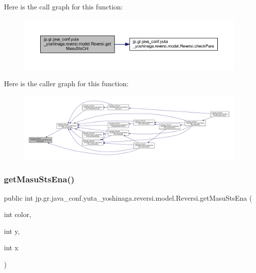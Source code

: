 Here is the call graph for this function\+:\nopagebreak
\begin{figure}[H]
\begin{center}
\leavevmode
\includegraphics[width=350pt]{classjp_1_1gr_1_1java__conf_1_1yuta__yoshinaga_1_1reversi_1_1model_1_1_reversi_a1a528710342faba65975f4768d24b129_cgraph}
\end{center}
\end{figure}
Here is the caller graph for this function\+:\nopagebreak
\begin{figure}[H]
\begin{center}
\leavevmode
\includegraphics[width=350pt]{classjp_1_1gr_1_1java__conf_1_1yuta__yoshinaga_1_1reversi_1_1model_1_1_reversi_a1a528710342faba65975f4768d24b129_icgraph}
\end{center}
\end{figure}
\mbox{\label{classjp_1_1gr_1_1java__conf_1_1yuta__yoshinaga_1_1reversi_1_1model_1_1_reversi_a055f20327e781b1f6807dba0baa1e51b}} 
\subsubsection{\texorpdfstring{get\+Masu\+Sts\+Ena()}{getMasuStsEna()}}
{\footnotesize\ttfamily public int jp.\+gr.\+java\+\_\+conf.\+yuta\+\_\+yoshinaga.\+reversi.\+model.\+Reversi.\+get\+Masu\+Sts\+Ena (\begin{DoxyParamCaption}\item[{int}]{color,  }\item[{int}]{y,  }\item[{int}]{x }\end{DoxyParamCaption})}



